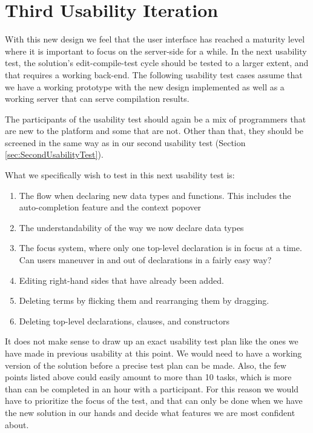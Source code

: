 \section{Third Usability Iteration}
\label{subsec:third_usability_test}
With this new design we feel that the user interface has reached a maturity
level where it is important to focus on the server-side for a while. In the
next usability test, the solution's edit-compile-test cycle should be tested to
a larger extent, and that requires a working back-end. The following usability
test cases assume that we have a working prototype with the new design
implemented as well as a working server that can serve compilation results.

The participants of the usability test should again be a mix of programmers
that are new to the platform and some that are not. Other than that, they
should be screened in the same way as in our second usability test (Section
\ref{sec:SecondUsabilityTest}).

What we specifically wish to test in this next usability test is:

\begin{enumerate}
	\item The flow when declaring new data types and functions. This includes the auto-completion feature and the context popover
	\item The understandability of the way we now declare data types
	\item The focus system, where only one top-level declaration is in focus at a
	time. Can users maneuver in and out of declarations in a fairly easy way?
	\item Editing right-hand sides that have already been added.
	\item Deleting terms by flicking them and rearranging them by dragging.
	\item Deleting top-level declarations, clauses, and constructors
\end{enumerate}

It does not make sense to draw up an exact usability test plan like the ones we have made in previous usability
at this point. We would need to have a working version of the solution before a precise test plan can be made. Also, the few points listed above could easily amount to more than 10 tasks, which is more than can be completed in an hour with a participant. For this reason we would have to prioritize the focus of the test, and that can only be done when we have the new solution in our hands and decide what features we are most confident about. 
